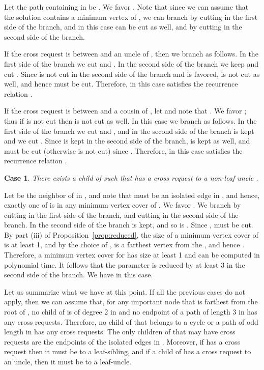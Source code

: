 \documentclass[11pt]{article}
\newtheorem{case}[theorem]{Case}
\begin{document}
Let the path containing  in  be . We favor . Note that since we can assume that the solution contains a minimum vertex of , we can branch by cutting  in the first side of the branch, and in this case  can be cut as well, and by cutting  in the second side of the branch.

If the cross request is between  and an uncle  of , then we branch as follows. In the first side of the branch we cut  and . In the second side of the branch we keep  and cut . Since  is not cut in the second side of the branch and  is favored,  is not cut as well, and hence  must be cut. Therefore,  in this case satisfies the recurrence relation .

If the cross request is between  and a cousin  of , let  and note that . We favor ; thus if  is not cut then  is not cut as well. In this case we branch as follows. In the first side of the branch we cut  and , and in the second side of the branch  is kept and we cut . Since  is kept in the second side of the branch,  is kept as well, and  must be cut (otherwise  is not cut) since . Therefore,  in this case satisfies the recurrence relation .


\begin{case}\label{case:1.5}
There exists a child  of  such that  has a cross request to a non-leaf uncle .
\end{case}

Let  be the neighbor of  in , and note that  must be an isolated edge in , and hence, exactly one of  is in any minimum vertex cover of . We favor . We branch by cutting  in the first side of the branch, and cutting  in the second side of the branch. In the second side of the branch  is kept, and so is . Since ,  must be cut. By part (iii) of Proposition~\ref{prop:reduced}, the size of a minimum vertex cover of  is at least 1, and by the choice of ,  is a farthest vertex from the , and hence . Therefore, a minimum vertex cover for  has size at least 1 and can be computed in polynomial time. It follows that the parameter is reduced by at least 3 in the second side of the branch. We have  in this case.

Let us summarize what we have at this point. If all the previous cases do not apply, then we can assume that, for any important node  that is farthest from the root  of , no child of  is of degree 2 in  and no endpoint of a path of length 3 in  has any cross requests. Therefore, no child of  that belongs to a cycle or a path of odd length  in  has any cross requests. The only children of  that may have cross requests are the endpoints of the isolated edges in . Moreover, if  has a cross request then it must be to a leaf-sibling, and if a child of  has a cross request to an uncle, then it must be to a leaf-uncle.
\end{document}
